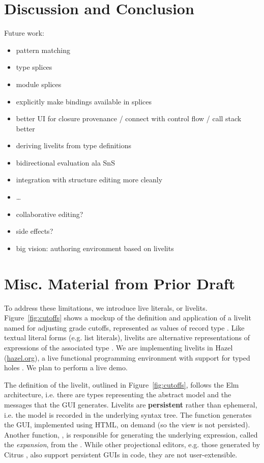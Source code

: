 \section{Discussion and Conclusion}
Future work:
\begin{itemize}
  \item pattern matching
  \item type splices
  \item module splices
  \item explicitly make bindings available in splices
  \item better UI for closure provenance / connect with control flow / call stack better
  \item deriving livelits from type definitions
  \item bidirectional evaluation ala SnS
  \item integration with structure editing more cleanly
  \item \dots
  \item collaborative editing?
  \item side effects?
  \item big vision: authoring environment based on livelits
\end{itemize}
\clearpage
\appendix
\section{Misc. Material from Prior Draft}

To address these limitations, we introduce live literals, or livelits. Figure~\ref{fig:cutoffs} shows a mockup of the definition and application of a livelit named  for adjusting grade cutoffs, represented as values of  record type . Like textual literal forms (e.g. list literals), livelits are alternative representations of expressions of the associated type \cite{DBLP:journals/pacmpl/OmarA18}. %
We are implementing livelits in Hazel (\url{hazel.org}), a live functional programming environment with support for typed holes \cite{popl-paper}. We plan to perform a live demo.




The definition of
the livelit, outlined in Figure~\ref{fig:cutoffs}, follows the Elm architecture,
i.e. there are types representing the abstract model and the messages that the 
GUI generates. Livelits are \textbf{persistent} rather than ephemeral, i.e. the model is recorded in the underlying syntax tree. The  function generates the GUI, implemented using HTML, on demand (so the view is not persisted). Another function, , is responsible for generating the underlying expression, called the \emph{expansion}, from the . 
While other projectional editors, e.g. those generated by Citrus \cite{DBLP:conf/uist/KoM05}, also support persistent GUIs in code, they are not user-extensible. 

